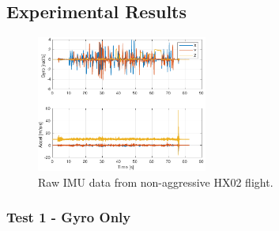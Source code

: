\documentclass[a4paper]{article}
\begin{document}
\subsection*{Experimental Results}

\begin{figure}[H]
  \centering
  \includegraphics[width=0.5\textwidth]{rawimu.pdf}
  \caption{Raw IMU data from non-aggressive HX02 flight.}
  \label{fig:rawimu}
\end{figure}

\subsubsection*{Test 1 - Gyro Only}
\end{document}
